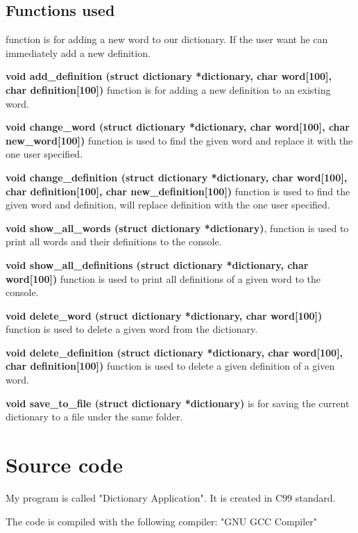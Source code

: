 \documentclass{article}
\begin{document}
\pagebreak

\subsection{Functions used}
\textbf{}
 function is for adding a new word to our dictionary. If the user want he can immediately add a new definition.  

{\bf void add\_definition (struct dictionary *dictionary, char word[100], char definition[100])} function is for adding a new definition to an existing word. 

{\bf void change\_word (struct dictionary *dictionary, char word[100], char new\_word[100])} function is used to find the given word and replace it with the one user specified.

{\bf void change\_definition (struct dictionary *dictionary, char word[100], char definition[100], char new\_definition[100])} function is used to find the given word and definition, will replace definition with the one user specified.

{\bf void show\_all\_words (struct dictionary *dictionary)}, function is used to print all words and their definitions to the console.

{\bf void show\_all\_definitions (struct dictionary *dictionary, char word[100])} function is used to print all definitions of a given word to the console.

{\bf void delete\_word (struct dictionary *dictionary, char word[100])} function is used to delete a given word from the dictionary.

{\bf void delete\_definition (struct dictionary *dictionary, char word[100], char definition[100])} function is used to delete a given definition of a given word.



{\bf void save\_to\_file (struct dictionary *dictionary)} is for saving the current dictionary to a file under the same folder.  

\section{Source code}
\textbf{}
\indent My program is called "Dictionary Application". It is created in C99 standard.

The code is compiled with the following compiler: "GNU GCC Compiler"
\end{document}
